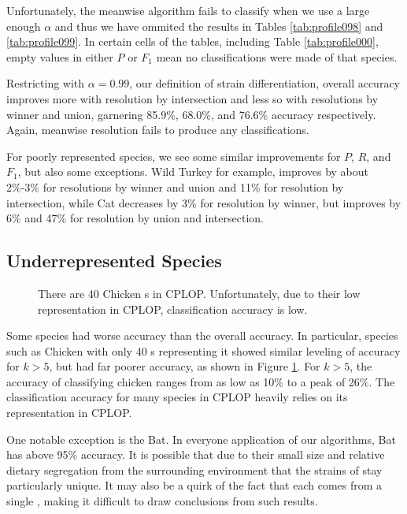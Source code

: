 Unfortunately, the meanwise algorithm fails to classify when we use a large enough $\alpha$ and thus we have ommited the results in Tables \ref{tab:profile098} and \ref{tab:profile099}. In certain cells of the tables, including Table \ref{tab:profile000}, empty values in either $P$ or $F_1$ mean no classifications were made of that species.




Restricting with $\alpha=0.99$, our definition of strain differentiation, overall accuracy improves more with resolution by intersection and less so with resolutions by winner and union, garnering 85.9\%, 68.0\%, and 76.6\% accuracy respectively. Again, meanwise resolution fails to produce any classifications.

For poorly represented species, we see some similar improvements for $P$, $R$, and $F_1$, but also some exceptions. Wild Turkey for example, improves by about 2\%-3\% for resolutions by winner and union and 11\% for resolution by intersection, while Cat decreases by 3\% for resolution by winner, but improves by 6\% and 47\% for resolution by union and intersection.

\subsection{Underrepresented Species}
\begin{figure}[t]
\centering
{}
\caption{There are 40 Chicken \isol{}s in CPLOP. Unfortunately, due to their low representation in CPLOP, classification accuracy is low.}
\label{fig:k_chicken}
\end{figure}
Some species had worse accuracy than the overall accuracy. In particular, species such as Chicken with only 40 \isol{}s representing it showed similar leveling of accuracy for $k>5$, but had far poorer accuracy, as shown in Figure \ref{fig:k_chicken}. For $k>5$, the accuracy of classifying chicken ranges from as low as 10\% to a peak of 26\%. The classification accuracy for many species in CPLOP heavily relies on its representation in CPLOP.

One notable exception is the Bat. In everyone application of our \kNN{} algorithms, Bat has above 95\% accuracy. It is possible that due to their small size and relative dietary segregation from the surrounding environment that the strains of \ecoli{} stay particularly unique. It may also be a quirk of the fact that each \isol{} comes from a single \host{}, making it difficult to draw conclusions from such results.
